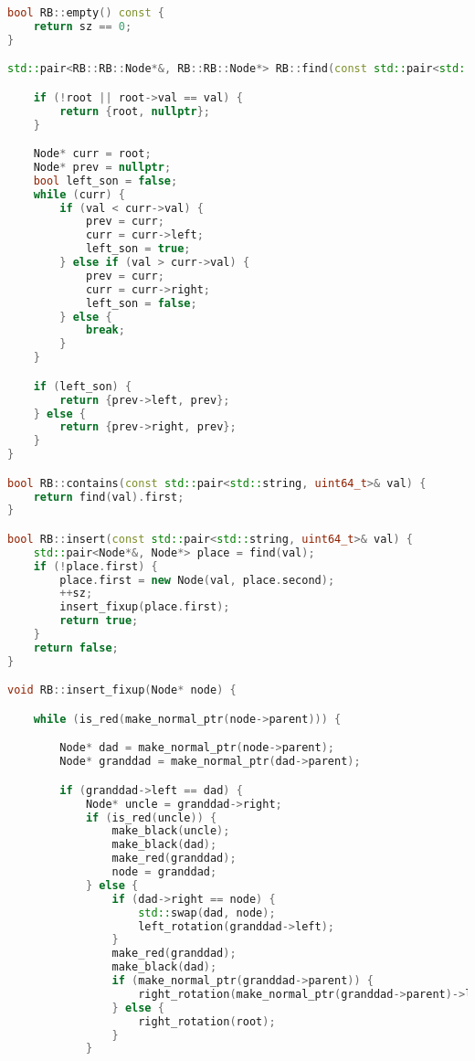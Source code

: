 \begin{lstlisting}[language=C++]
bool RB::empty() const {
    return sz == 0;
}

std::pair<RB::RB::Node*&, RB::RB::Node*> RB::find(const std::pair<std::string, uint64_t>& val) {

    if (!root || root->val == val) {
        return {root, nullptr};
    }

    Node* curr = root;
    Node* prev = nullptr;
    bool left_son = false;
    while (curr) {
        if (val < curr->val) {
            prev = curr;
            curr = curr->left;
            left_son = true;
        } else if (val > curr->val) {
            prev = curr;
            curr = curr->right;
            left_son = false;
        } else {
            break;
        }
    }    

    if (left_son) {
        return {prev->left, prev};
    } else {
        return {prev->right, prev};
    }
}

bool RB::contains(const std::pair<std::string, uint64_t>& val) {
    return find(val).first;
}

bool RB::insert(const std::pair<std::string, uint64_t>& val) {
    std::pair<Node*&, Node*> place = find(val);
    if (!place.first) {
        place.first = new Node(val, place.second);
        ++sz;
        insert_fixup(place.first);
        return true;
    }
    return false;
}

void RB::insert_fixup(Node* node) {

    while (is_red(make_normal_ptr(node->parent))) {

        Node* dad = make_normal_ptr(node->parent);
        Node* granddad = make_normal_ptr(dad->parent);

        if (granddad->left == dad) {
            Node* uncle = granddad->right;
            if (is_red(uncle)) {
                make_black(uncle);
                make_black(dad);
                make_red(granddad);
                node = granddad;
            } else {
                if (dad->right == node) {
                    std::swap(dad, node);
                    left_rotation(granddad->left);
                }
                make_red(granddad);
                make_black(dad);
                if (make_normal_ptr(granddad->parent)) {
                    right_rotation(make_normal_ptr(granddad->parent)->left == granddad ? make_normal_ptr(granddad->parent)->left : make_normal_ptr(granddad->parent)->right);
                } else {
                    right_rotation(root);
                }
            }


\end{lstlisting}
